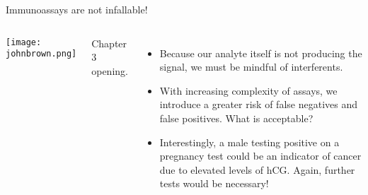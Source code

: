 \documentclass[notes=only]{beamer}
\begin{document}
%
%
%

\clearpage

\begin{frame}{Immunoassays are not infallable!}
	\begin{columns}
		\begin{center}
			\texttt{[image: johnbrown.png]}

		\end{center}
		\footnotesize{Chapter 3 opening.}
		\begin{itemize}
			\item Because our analyte itself is not producing the
				signal, we must be mindful of interferents.
			\item With increasing complexity of assays, we introduce
				a greater risk of false negatives and false
				positives. What is acceptable?

				\bigskip

			\item Interestingly, a male testing positive on a
				pregnancy test could be an indicator of cancer
				due to elevated levels of hCG. Again, further
				tests would be necessary!
		\end{itemize}
	\end{columns}
\end{frame}
\end{document}
